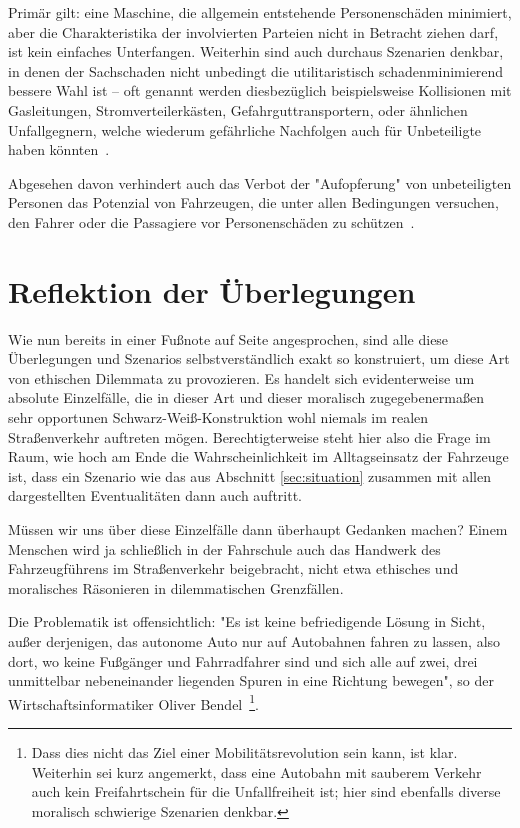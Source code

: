\documentclass[twocolumn, german]{tum-article}
\begin{document}
Primär gilt: eine Maschine, die allgemein entstehende Personenschäden minimiert, aber die Charakteristika der involvierten Parteien nicht in Betracht ziehen darf, ist kein einfaches Unterfangen.
Weiterhin sind auch durchaus Szenarien denkbar, in denen der Sachschaden nicht unbedingt die utilitaristisch schadenminimierend bessere Wahl ist -- oft genannt werden diesbezüglich beispielsweise Kollisionen mit Gasleitungen, Stromverteilerkästen, Gefahrguttransportern, oder ähnlichen Unfallgegnern, welche wiederum gefährliche Nachfolgen auch für Unbeteiligte haben könnten~\cite[S. 552f.]{ethics-code}.

Abgesehen davon verhindert auch das Verbot der "Aufopferung" von unbeteiligten Personen das Potenzial von Fahrzeugen, die unter allen Bedingungen versuchen, den Fahrer oder die Passagiere vor Personenschäden zu schützen~\cite[S. 553]{ethics-code}.


\section{Reflektion der Überlegungen}
\label{sec:reflect}
Wie nun bereits in einer Fußnote auf Seite \pageref{fn:constructed} angesprochen, sind alle diese Überlegungen und Szenarios selbstverständlich exakt so konstruiert, um diese Art von ethischen Dilemmata zu provozieren.
Es handelt sich evidenterweise um absolute Einzelfälle, die in dieser Art und dieser moralisch zugegebenermaßen sehr opportunen Schwarz-Weiß-Konstruktion wohl niemals im realen Straßenverkehr auftreten mögen.
Berechtigterweise steht hier also die Frage im Raum, wie hoch am Ende die Wahrscheinlichkeit im Alltagseinsatz der Fahrzeuge ist, dass ein Szenario wie das aus Abschnitt \ref{sec:situation} zusammen mit allen dargestellten Eventualitäten dann auch auftritt.

Müssen wir uns über diese Einzelfälle dann überhaupt Gedanken machen?
Einem Menschen wird ja schließlich in der Fahrschule auch das Handwerk des Fahrzeugführens im Straßenverkehr beigebracht, nicht etwa ethisches und moralisches Räsonieren in dilemmatischen Grenzfällen.

Die Problematik ist offensichtlich:
"Es ist keine befriedigende Lösung in Sicht, außer derjenigen, das autonome Auto nur auf Autobahnen fahren zu lassen, also dort, wo keine Fußgänger und Fahrradfahrer sind und sich alle auf zwei, drei unmittelbar nebeneinander liegenden Spuren in eine Richtung bewegen", so der Wirtschaftsinformatiker Oliver Bendel~\cite[S. 29]{bendel-mascheth}\footnote{Dass dies nicht das Ziel einer Mobilitätsrevolution sein kann, ist klar. Weiterhin sei kurz angemerkt, dass eine Autobahn mit sauberem Verkehr auch kein Freifahrtschein für die Unfallfreiheit ist; hier sind ebenfalls diverse moralisch schwierige Szenarien denkbar.}.
\end{document}
